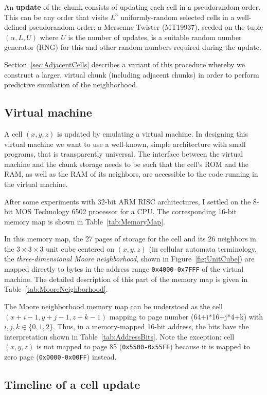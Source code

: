 \documentclass{article}
\newcommand\hex[1]{{\tt 0x#1}}
\newcommand\hexrange[2]{\hex{#1}{\tt -}\hex{#2}}
\begin{document}
An {\bf update} of the chunk consists of updating each cell in a pseudorandom order.
This can be any order that visits $L^3$ uniformly-random selected cells in a well-defined pseudorandom order;
a Mersenne Twister (MT19937),
seeded on the tuple $(\alpha,L,U)$ where $U$ is the number of updates,
is a suitable random number generator (RNG) for this and other random numbers required during the update.

Section~\ref{sec:AdjacentCells} describes a variant of this procedure whereby we construct a larger,
virtual chunk (including adjacent chunks) in order to perform predictive simulation of the neighborhood.

\subsection{Virtual machine}

A cell $(x,y,z)$ is updated by emulating a virtual machine.
In designing this virtual machine we want to use a well-known, simple architecture with small programs,
that is transparently universal.
The interface between the virtual machine and the chunk storage
needs to be such that the cell's ROM and the RAM, as well as the RAM of its neighbors,
are accessible to the code running in the virtual machine.

After some experiments with 32-bit ARM RISC architectures,
I settled on the 8-bit MOS Technology 6502 processor for a CPU.
The corresponding 16-bit memory map is shown in Table~\ref{tab:MemoryMap}.

In this memory map, the 27 pages of storage
for the cell and its 26 neighbors
in the $3 \times 3 \times 3$ unit cube centered on $(x,y,z)$
(in cellular automata terminology, the {\em three-dimensional Moore neighborhood}, shown in Figure~\ref{fig:UnitCube})
are mapped directly to bytes in the address range \hexrange{4000}{7FFF} of the virtual machine.
The detailed description of this part of the memory map
is given in Table~\ref{tab:MooreNeighborhood}.

The Moore neighborhood memory map can be understood as the cell $(x+i-1,y+j-1,z+k-1)$
mapping to page number (64+i*16+j*4+k) with $i,j,k \in \{0,1,2\}$.
Thus, in a memory-mapped 16-bit address, the bits have the interpretation shown in Table~\ref{tab:AddressBits}.
Note the exception: cell $(x,y,z)$ is not mapped to page 85 (\hexrange{5500}{55FF})
because it is mapped to zero page (\hexrange{0000}{00FF}) instead.

\subsection{Timeline of a cell update}
\label{sec:Timeline}
\end{document}
